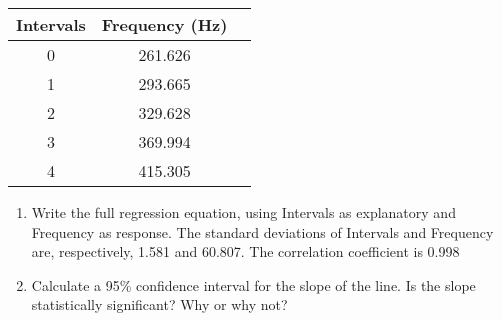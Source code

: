 \documentclass[11pt]{book}\usepackage[]{graphicx}\usepackage[]{color}
\begin{document}
\begin{exercises}
\begin{exercise}
\begin{center}
\begin{tabular}{@{} ccc @{}} \hline
Intervals &	Frequency (Hz) \\ \hline
0&	261.626 \\
1&	293.665 \\
2&	329.628 \\
3&	369.994 \\
4&	415.305 \\ \hline
\end{tabular}
\end{center}

\begin{enumerate}
  \item Write the full regression equation, using Intervals as explanatory and Frequency as response. The standard deviations of Intervals and Frequency are, respectively, 1.581 and 60.807. The correlation coefficient is 0.998

  \item	Calculate a 95\% confidence interval for the slope of the line. Is the slope statistically significant?  Why or why not?
\end{enumerate}

\end{exercise}
\begin{solution}  %

\end{solution}














\end{exercises}
\end{document}

